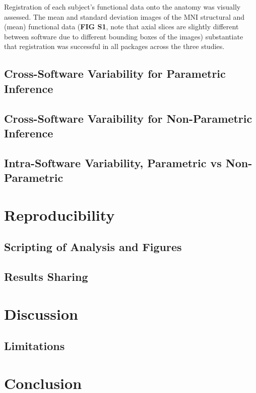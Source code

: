 Registration of each subject's functional data onto the anatomy was visually assessed. The mean and standard deviation images of the MNI structural and (mean) functional data (\textbf{FIG S1}, note that axial slices are slightly different between software due to different bounding boxes of the images) substantiate that registration was successful in all packages across the three studies. 


\subsection{Cross-Software Variability for Parametric Inference}

\subsection{Cross-Software Varaibility for Non-Parametric Inference}

\subsection{Intra-Software Variability, Parametric vs Non-Parametric}

\section{Reproducibility}

\subsection{Scripting of Analysis and Figures}

\subsection{Results Sharing}

\section{Discussion}

\subsection{Limitations}

\section{Conclusion}

